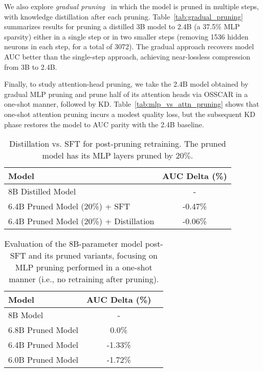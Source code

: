 We also explore \emph{gradual pruning}~\cite{benbaki2023fast} in which the model is pruned in multiple steps, with knowledge distillation after each pruning. Table~\ref{tab:gradual_pruning} summarizes results for pruning a distilled 3B model to 2.4B (a 37.5\% MLP sparsity) either in a single step or in two smaller steps (removing 1536 hidden neurons in each step, for a total of 3072). The gradual approach recovers model AUC better than the single-step approach, achieving near-lossless compression from 3B to 2.4B.

Finally, to study attention-head pruning, we take the 2.4B model obtained by gradual MLP pruning and prune half of its attention heads via OSSCAR in a one-shot manner, followed by KD. Table~\ref{tab:mlp_vs_attn_pruning} shows that one-shot attention pruning incurs a modest quality loss, but the subsequent KD phase restores the model to AUC parity with the 2.4B baseline.













\begin{table}[t]
\centering
\begin{tabular}{lc}
\hline\hline
\textbf{Model} & \textbf{AUC Delta (\%)} \\
\hline\hline
8B Distilled Model  & -\\ %
6.4B Pruned Model (20\%) + SFT   &-0.47\%  \\
6.4B Pruned Model (20\%) + Distillation   &-0.06\%  \\
\hline\hline
\end{tabular}
\caption{Distillation vs. SFT for post-pruning retraining. The pruned model has its MLP layers pruned by $20\%$.}
\label{table:prune_sft_vs_distil}
\label{tab:sft_kd_for_prune}
\end{table}




\begin{table}[t]
\centering
\begin{tabular}{lcc}
\hline\hline
\textbf{Model}  & \textbf{AUC Delta (\%)} \\
\hline\hline
8B Model    &  - \\
6.8B Pruned Model    & 0.0\% \\
6.4B Pruned Model   &  -1.33\% \\
6.0B Pruned Model   &  -1.72\% \\

\hline\hline
\end{tabular}
\caption{Evaluation of the 8B-parameter model post-SFT and its pruned variants, focusing on MLP pruning performed in a one-shot manner (i.e., no retraining after pruning).}
\label{tab:amount_pruning}
\end{table}

